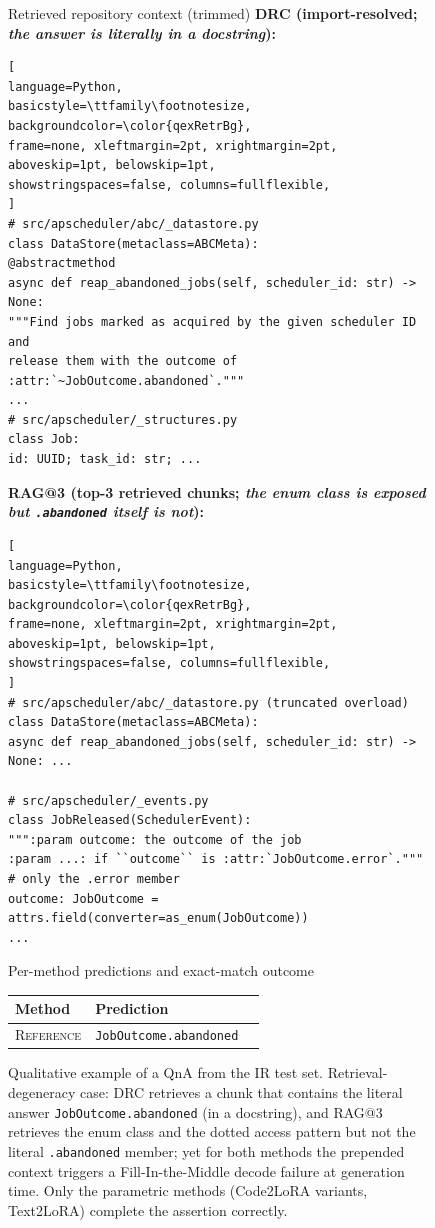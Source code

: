\documentclass[11pt]{article}
\newcommand{\codelora}{Code2LoRA\xspace}
\newcommand{\textlora}{Text2LoRA\xspace}
\begin{document}
\begin{figure}[!htbp]
\begin{center}
\begin{tcolorbox}
\begin{qexsection}{Retrieved repository context (trimmed)}
\textbf{\footnotesize DRC (import-resolved; \emph{the answer is literally in a docstring}):}
\begin{lstlisting}[
language=Python,
basicstyle=\ttfamily\footnotesize,
backgroundcolor=\color{qexRetrBg},
frame=none, xleftmargin=2pt, xrightmargin=2pt,
aboveskip=1pt, belowskip=1pt,
showstringspaces=false, columns=fullflexible,
]
# src/apscheduler/abc/_datastore.py
class DataStore(metaclass=ABCMeta):
@abstractmethod
async def reap_abandoned_jobs(self, scheduler_id: str) -> None:
"""Find jobs marked as acquired by the given scheduler ID and
release them with the outcome of :attr:`~JobOutcome.abandoned`."""
...
# src/apscheduler/_structures.py
class Job:
id: UUID; task_id: str; ...
\end{lstlisting}
\textbf{\footnotesize RAG@3 (top-3 retrieved chunks; \emph{the enum class is exposed but \texttt{.abandoned} itself is not}):}
\begin{lstlisting}[
language=Python,
basicstyle=\ttfamily\footnotesize,
backgroundcolor=\color{qexRetrBg},
frame=none, xleftmargin=2pt, xrightmargin=2pt,
aboveskip=1pt, belowskip=1pt,
showstringspaces=false, columns=fullflexible,
]
# src/apscheduler/abc/_datastore.py (truncated overload)
class DataStore(metaclass=ABCMeta):
async def reap_abandoned_jobs(self, scheduler_id: str) -> None: ...

# src/apscheduler/_events.py
class JobReleased(SchedulerEvent):
""":param outcome: the outcome of the job
:param ...: if ``outcome`` is :attr:`JobOutcome.error`."""   # only the .error member
outcome: JobOutcome = attrs.field(converter=as_enum(JobOutcome))
...
\end{lstlisting}
\end{qexsection}

\begin{qexsection}{Per-method predictions and exact-match outcome}
\footnotesize
\setlength{\tabcolsep}{6pt}
\begin{tabular}{@{}llc@{}}
\toprule
Method & Prediction  \\
\midrule
\textsc{Reference}                            & \texttt{JobOutcome.abandoned}                                       & \\
\end{tabular}
\end{qexsection}


\end{tcolorbox}
\caption{Qualitative example of a QnA from the IR test set. Retrieval-degeneracy case: DRC retrieves a chunk that contains the literal answer \texttt{JobOutcome.abandoned} (in a docstring), and RAG@3 retrieves the enum class and the dotted access pattern but not the literal \texttt{.abandoned} member; yet for both methods the prepended context triggers a Fill-In-the-Middle decode failure at generation time. Only the parametric methods (\codelora{} variants, \textlora{}) complete the assertion correctly.}
\label{fig:qualitative_ir_apscheduler_245}
\end{center}
\end{figure}
\end{document}
